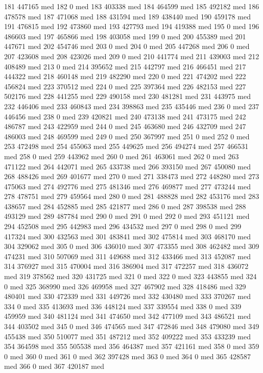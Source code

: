 {181 447165 med
182 0 med
183 403338 med
184 464599 med
185 492182 med
186 478578 med
187 471068 med
188 431594 med
189 438440 med
190 459178 med
191 476815 med
192 473860 med
193 427793 med
194 419388 med
195 0 med
196 486603 med
197 465866 med
198 403058 med
199 0 med
200 455389 med
201 447671 med
202 454746 med
203 0 med
204 0 med
205 447268 med
206 0 med
207 423608 med
208 423026 med
209 0 med
210 441774 med
211 439003 med
212 408489 med
213 0 med
214 395652 med
215 442797 med
216 466451 med
217 444322 med
218 460148 med
219 482290 med
220 0 med
221 474202 med
222 456824 med
223 370512 med
224 0 med
225 397364 med
226 482153 med
227 502176 med
228 441255 med
229 490158 med
230 481281 med
231 443975 med
232 446406 med
233 460843 med
234 398863 med
235 435446 med
236 0 med
237 446456 med
238 0 med
239 420821 med
240 473138 med
241 473175 med
242 486787 med
243 422959 med
244 0 med
245 463680 med
246 432709 med
247 486003 med
248 469599 med
249 0 med
250 367997 med
251 0 med
252 0 med
253 472498 med
254 455063 med
255 449625 med
256 494274 med
257 466531 med
258 0 med
259 443962 med
260 0 med
261 463061 med
262 0 med
263 471122 med
264 442071 med
265 433738 med
266 393150 med
267 450080 med
268 488426 med
269 401677 med
270 0 med
271 338473 med
272 448280 med
273 475063 med
274 492776 med
275 481346 med
276 469877 med
277 473244 med
278 478751 med
279 459564 med
280 0 med
281 488828 med
282 453176 med
283 438657 med
284 452885 med
285 421877 med
286 0 med
287 398538 med
288 493129 med
289 487784 med
290 0 med
291 0 med
292 0 med
293 451121 med
294 452508 med
295 442983 med
296 434532 med
297 0 med
298 0 med
299 417324 med
300 432563 med
301 483841 med
302 475814 med
303 468170 med
304 329062 med
305 0 med
306 436010 med
307 473355 med
308 462482 med
309 474231 med
310 507069 med
311 449688 med
312 433466 med
313 452087 med
314 376927 med
315 470004 med
316 386904 med
317 472257 med
318 436072 med
319 378562 med
320 431725 med
321 0 med
322 0 med
323 443855 med
324 0 med
325 368990 med
326 469958 med
327 467902 med
328 418486 med
329 480401 med
330 472339 med
331 449726 med
332 430480 med
333 370267 med
334 0 med
335 413693 med
336 448124 med
337 339554 med
338 0 med
339 459959 med
340 481124 med
341 474650 med
342 477109 med
343 486521 med
344 403502 med
345 0 med
346 474565 med
347 472846 med
348 479080 med
349 455438 med
350 510077 med
351 487212 med
352 409222 med
353 433239 med
354 364598 med
355 505538 med
356 464387 med
357 421161 med
358 0 med
359 0 med
360 0 med
361 0 med
362 397428 med
363 0 med
364 0 med
365 428587 med
366 0 med
367 420187 med
}
